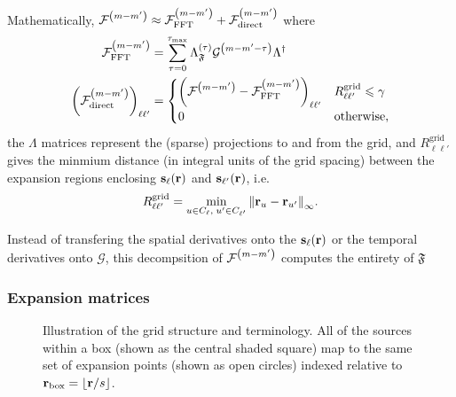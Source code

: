 Mathematically,  $\mathcal{F}^\qty(m - m') \approx \mathcal{F}^\qty(m-m')_\text{FFT} + \mathcal{F}^\qty(m-m')_\text{direct}$ where
\begin{subequations}
  \begin{align}
    \mathcal{F}^\qty(m-m')_\text{FFT} &= \sum_{\tau = 0}^{\tau_\text{max}} \Lambda_\mathfrak{F}^\qty(\tau) \mathcal{G}^\qty(m - m' - \tau) \Lambda^\dagger \\
    \qty(\mathcal{F}^\qty(m-m')_\text{direct})_{\ell\ell'} &= \begin{cases}
      \qty(\mathcal{F}^\qty(m-m') - \mathcal{F}^\qty(m-m')_\text{FFT})_{\ell\ell'} & R^\text{grid}_{\ell\ell'} \leqslant \gamma \\
      0 & \text{otherwise},
    \end{cases}
  \end{align}
\end{subequations}
the $\Lambda$ matrices represent the (sparse) projections to and from the grid, and $R^\text{grid}_{\ell\ell'}$ gives the minmium distance (in integral units of the grid spacing) between the expansion regions enclosing $\vb{s}_\ell(\vb{r})$ and $\vb{s}_{\ell'}(\vb{r})$, i.e.
\begin{equation}
  R^\text{grid}_{\ell\ell'} = \min_{u \in C_\ell,\; u' \in C_{\ell'}} \norm{\vb{r}_u - \vb{r}_{u'}}_\infty.
\end{equation}


Instead of transfering the spatial derivatives onto the $\vb{s}_\ell(\vb{r})$ or the temporal derivatives onto $\mathcal{G}$,  this decompsition of $\mathcal{F}^\qty(m - m')$ computes the entirety of $\mathfrak{F}$

\subsubsection{Expansion matrices}

\begin{figure}
  \centering
  
  \caption{\label{fig:aim terminology} Illustration of the grid structure and terminology.
    All of the sources within a box (shown as the central shaded square) map to the same set of expansion points (shown as open circles) indexed relative to $\vb{r}_\text{box} = \lfloor\vb{r}/s\rfloor$.
  }
\end{figure}

